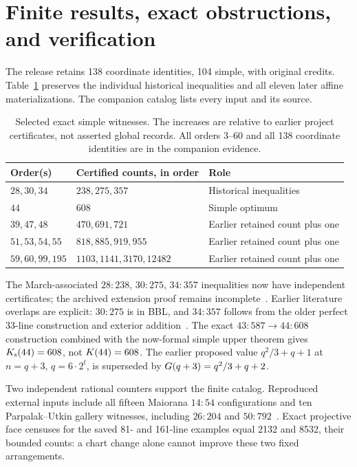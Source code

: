 \section{Finite results, exact obstructions, and verification}\label{j:verification}

The release retains 138 coordinate identities, 104 simple, with original credits. Table~\ref{j:finite} preserves the individual historical inequalities and all eleven later affine materializations. The companion catalog lists every input and its source.
\begin{table}[tb]
\centering\small
\begin{tabular}{@{}llp{.33\linewidth}@{}}
\toprule
Order(s) & Certified counts, in order & Role\\\midrule
$28,30,34$ & $238,275,357$ & Historical inequalities\\
$44$ & $608$ & Simple optimum\\
$39,47,48$ & $470,691,721$ & Earlier retained count plus one\\
$51,53,54,55$ & $818,885,919,955$ & Earlier retained count plus one\\
$59,60,99,195$ & $1103,1141,3170,12482$ & Earlier retained count plus one\\
\bottomrule
\end{tabular}
\caption{Selected exact simple witnesses. The increases are relative to earlier project certificates, not asserted global records. All orders 3--60 and all 138 coordinate identities are in the companion evidence.}\label{j:finite}
\end{table}

The March-associated $28{:}238$, $30{:}275$, $34{:}357$ inequalities now have independent certificates; the archived extension proof remains incomplete~\cite{zarzuelo2026,oeisA006066}. Earlier literature overlaps are explicit: $30{:}275$ is in BBL, and $34{:}357$ follows from the older perfect 33-line construction and exterior addition~\cite{bbl2008,forge1998}. The exact $43{:}587\to44{:}608$ construction combined with the now-formal simple upper theorem gives $K_{\mathrm s}(44)=608$, not $K(44)=608$. The earlier proposed value $q^2/3+q+1$ at $n=q+3$, $q=6\cdot2^t$, is superseded by $G(q+3)=q^2/3+q+2$.

Two independent rational counters support the finite catalog. Reproduced external inputs include all fifteen Maiorana $14{:}54$ configurations and ten Parpalak--Utkin gallery witnesses, including $26{:}204$ and $50{:}792$~\cite{maiorana2026,parpalakutkinGallery2026}. Exact projective face censuses for the saved 81- and 161-line examples equal 2132 and 8532, their bounded counts: a chart change alone cannot improve these two fixed arrangements.

